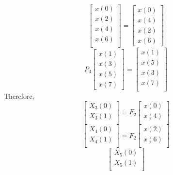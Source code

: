 \documentclass[journal,12pt,twocolumn]{IEEEtran}
\renewcommand\thesection{\arabic{section}}
\begin{document}
\begin{enumerate}[label=\arabic*.,ref=\thesection.\theenumi]
\begin{equation}
\begin{bmatrix}
		x(0) \\ 
		x(2) \\ 
		x(4) \\ 
		x(6) \\
	\end{bmatrix}
	= 
	\begin{bmatrix}
		x(0) \\ 
		x(4) \\ 
		x(2) \\
		x(6)
	\end{bmatrix}
\end{equation}
\begin{equation}
	P_{4}
	\begin{bmatrix}
		x(1) \\ 
		x(3) \\ 
		x(5) \\
		x(7)
	\end{bmatrix}
	= 
	\begin{bmatrix}
		x(1) \\ 
		x(5) \\ 
		x(3) \\ 
		x(7) \\
	\end{bmatrix}
\end{equation}
Therefore,
\begin{equation}
	\begin{bmatrix}
		X_{3}(0) \\ 
		X_{3}(1)\\ 
	\end{bmatrix}
	= F_{2}
	\begin{bmatrix}
		x(0) \\ 
		x(4) \\ 
	\end{bmatrix}
\end{equation}
\begin{equation}
	\begin{bmatrix}
		X_{4}(0) \\ 
		X_{4}(1)\\ 
	\end{bmatrix}
	= F_{2}
	\begin{bmatrix}
		x(2) \\ 
		x(6) \\ 
	\end{bmatrix}
\end{equation}
\begin{equation}
	\begin{bmatrix}
		X_{5}(0) \\ 
		X_{5}(1)\\ 

\end{bmatrix}
\end{equation}
\end{enumerate}
\end{document}
